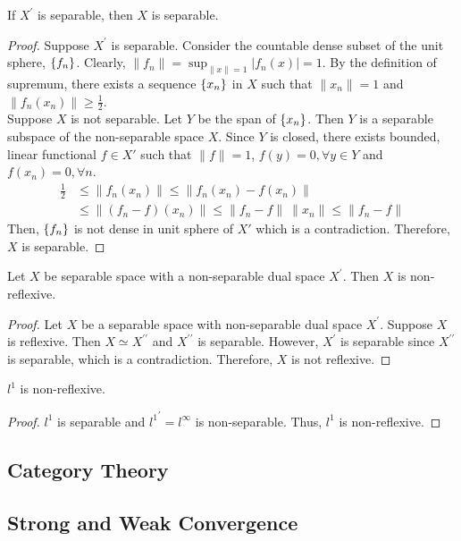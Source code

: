 \begin{theorem}
	If $X^\prime$ is separable, then $X$ is separable.
\end{theorem}
\begin{proof}
	Suppose $X^\prime$ is separable.
	Consider the countable dense subset of the unit sphere, $\left\{f_n\right\}$.
	Clearly, $\displaystyle \|f_n\| = \sup_{\|x\|=1}|f_n(x)| = 1$.
	By the definition of supremum, there exists a sequence $\left\{x_n\right\}$ in $X$ such that $\|x_n\| = 1$ and $\|f_n(x_n)\| \ge \frac{1}{2}$.\\

	Suppose $X$ is not separable.
	Let $Y$ be the span of $\left\{x_n\right\}$.
	Then $Y$ is a separable subspace of the non-separable space $X$.
	Since $Y$ is closed, there exists bounded, linear functional $f \in X'$ such that $\|f\| = 1$, $f(y) = 0,\forall y \in Y$ and $f(x_n) = 0,\forall n$.
	\begin{align*}
	\frac{1}{2}
		& \le \|f_n(x_n)\| 
		 \le \|f_n(x_n) - f(x_n)\| \\
		& \le \|(f_n-f)(x_n)\| 
		 \le \|f_n-f\|\ \|x_n\| 
		 \le \|f_n-f\|
	\end{align*}
	Then, $\left\{f_n\right\}$ is not dense in unit sphere of $X'$ which is a contradiction.
	Therefore, $X$ is separable.
\end{proof}

\begin{remark}
	Let $X$ be separable space with a non-separable dual space $X^\prime$.
	Then $X$ is non-reflexive.
\end{remark}
\begin{proof}
	Let $X$ be a separable space with non-separable dual space $X^\prime$.
	Suppose $X$ is reflexive.
	Then $X \simeq X^{\prime\prime}$ and $X^{\prime\prime}$ is separable.
	However, $X^\prime$ is separable since $X^{\prime\prime}$ is separable, which is a contradiction.
	Therefore, $X$ is not reflexive.
\end{proof}
\begin{important}
	$l^1$ is non-reflexive.
\end{important}
\begin{proof}
	$l^1$ is separable and ${l^1}^\prime = l^\infty$ is non-separable.
	Thus, $l^1$ is non-reflexive.
\end{proof}

\subsection{Category Theory}
\subsection{Strong and Weak Convergence}
